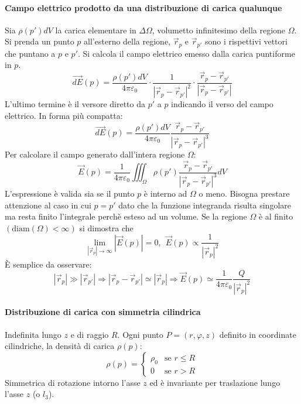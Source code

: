 \paragraph{Campo elettrico prodotto da una distribuzione di carica qualunque}
Sia $\rho(p')dV$ la carica elementare in $\Delta\Omega$, volumetto infinitesimo della regione $\Omega$.
Si prenda un punto $p$ all'esterno della regione, $\vec{r}_p$ e $\vec{r}_{p'}$ sono i rispettivi vettori
che puntano a $p$ e $p'$.
Si calcola il campo elettrico emesso dalla carica puntiforme in $p$.
$$
\vec{dE}(p) = \frac{\rho(p')dV}{4\pi\varepsilon_0}\cdot\frac{1}{|\vec{r}_p-\vec{r}_{p'}|^2} \cdot\frac{\vec{r}_p-\vec{r}_{p'}}{|\vec{r}_p-\vec{r}_{p'}|}
$$
L'ultimo termine è il versore diretto da $p'$ a $p$ indicando il verso del campo elettrico.
In forma più compatta:
$$
\vec{dE}(p) = \frac{\rho(p')dV}{4\pi \varepsilon_0} \frac{\vec{r}_p-\vec{r}_{p'}}{|\vec{r}_p-\vec{r}_{p'}|^3}
$$
Per calcolare il campo generato dall'intera regione $\Omega$:
$$
\vec{E}(p) = \frac{1}{4\pi\varepsilon_0} \iiint_\Omega \rho(p')  \frac{\vec{r}_p-\vec{r}_{p'}}{|\vec{r}_p-\vec{r}_{p'}|^3} dV
$$
L'espressione è valida sia se il punto $p$ è interno ad $\Omega$ o meno. Bisogna prestare attenzione
al caso in cui $p=p'$ dato che la funzione integranda risulta singolare ma resta finito l'integrale
perchè esteso ad un volume.
Se la regione $\Omega$ è al finito $(\text{diam}(\Omega)<\infty)$ si dimostra che 
$$
\lim_{|\vec{r}_p| \to \infty} |\vec{E}(p)| = 0,\ \ \vec{E}(p) \propto \frac{1}{|\vec{r}_p|^2}
$$
È semplice da osservare:
$$
|\vec{r}_p| \gg |\vec{r}_{p'}| \Rightarrow |\vec{r}_p -\vec{r}_{p'}| \simeq |\vec{r}_p| \Rightarrow
\vec{E}(p) \simeq \frac{1}{4 \pi \varepsilon_0}\frac{Q}{|\vec{r}_p|^2}
$$

\newpage
\paragraph{Distribuzione di carica con simmetria cilindrica}
Indefinita lungo $z$ e di raggio $R$.
Ogni punto $P= (r,\varphi,z)$ definito in coordinate cilindriche, la densità di carica $\rho(p)$:
$$
\rho(p) = \begin{cases}
\rho_0 & \text{se }  r \leq R\\
0 & \text{se }  r > R
\end{cases}
$$
Simmetrica di rotazione intorno l'asse $z$ ed è invariante per traslazione lungo l'asse $z$ (o $l_3$).

